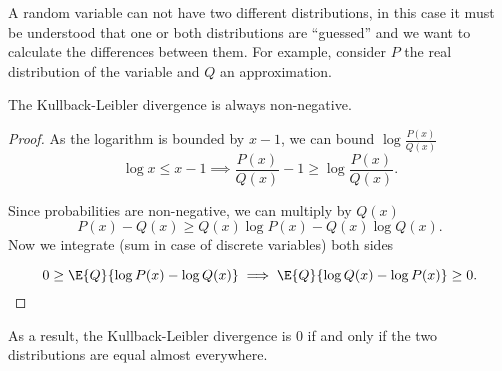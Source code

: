 \begin{remark}
  A random variable can not have two different distributions, in this case it must be understood that one or both distributions are ``guessed'' and we want to calculate the differences between them. For example, consider \(P\) the real distribution of the variable and \(Q\) an approximation.
\end{remark}

\begin{proposition}
The Kullback-Leibler divergence is always non-negative.
\end{proposition}
\begin{proof}
  As the logarithm is bounded by \(x - 1\), we can bound \(\log{\frac{P(x)}{Q(x)}}\)
  \[
    \log{x} \leq x - 1 \implies \frac{P(x)}{Q(x)} - 1 \geq \log{\frac{P(x)}{Q(x)}}.
  \]

  Since probabilities are non-negative, we can multiply by \(Q(x)\)
  \[
    P(x) - Q(x) \geq Q(x) \log{P(x)} - Q(x) \log{Q(x)}.
  \]
  Now we integrate (sum in case of discrete variables) both sides

  \[
    0 \geq \E{Q}{\log{P(x)} - \log{Q(x)}} \implies \E{Q}{\log{Q(x)}
    - \log{P(x)}} \geq 0.
  \]
\end{proof}
As a result, the Kullback-Leibler divergence is \(0\) if and only if the two
distributions are equal almost everywhere.

